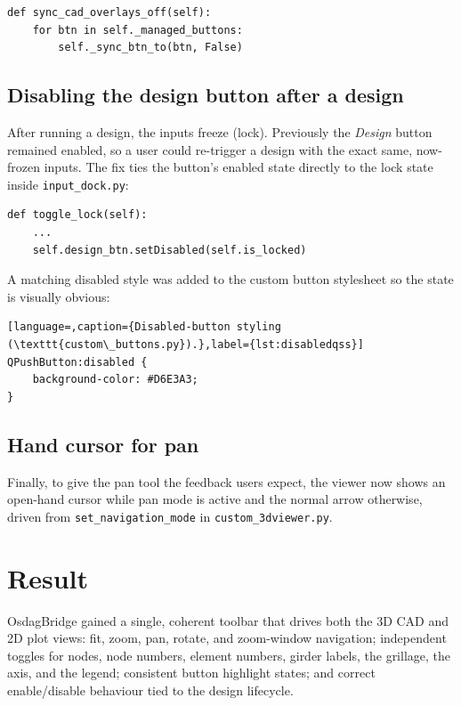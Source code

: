 \begin{lstlisting}[caption={Reset every managed toggle when the CAD overlays clear (\texttt{toolbar\_controller.py}).},label={lst:tbreset}]
def sync_cad_overlays_off(self):
    for btn in self._managed_buttons:
        self._sync_btn_to(btn, False)
\end{lstlisting}

\subsection{Disabling the design button after a design}
After running a design, the inputs freeze (lock). Previously the \emph{Design} button remained
enabled, so a user could re-trigger a design with the exact same, now-frozen inputs. The fix
ties the button's enabled state directly to the lock state inside
\texttt{input\_dock.py}:

\begin{lstlisting}[caption={Disable the design button whenever the inputs are locked (\texttt{input\_dock.py}).},label={lst:designbtn}]
def toggle_lock(self):
    ...
    self.design_btn.setDisabled(self.is_locked)
\end{lstlisting}

A matching disabled style was added to the custom button stylesheet so the state is visually
obvious:

\begin{lstlisting}[language=,caption={Disabled-button styling (\texttt{custom\_buttons.py}).},label={lst:disabledqss}]
QPushButton:disabled {
    background-color: #D6E3A3;
}
\end{lstlisting}

\subsection{Hand cursor for pan}
Finally, to give the pan tool the feedback users expect, the viewer now shows an open-hand
cursor while pan mode is active and the normal arrow otherwise, driven from
\texttt{set\_navigation\_mode} in \texttt{custom\_3dviewer.py}.

\section{Result}
OsdagBridge gained a single, coherent toolbar that drives both the 3D CAD and 2D plot views:
fit, zoom, pan, rotate, and zoom-window navigation; independent toggles for nodes, node
numbers, element numbers, girder labels, the grillage, the axis, and the legend; consistent
button highlight states; and correct enable/disable behaviour tied to the design lifecycle.


